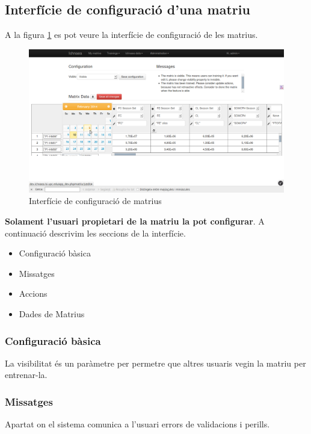 \subsection{Interfície de configuració d'una matriu}
\label{subsec:interfaceConfiguration}
A la figura \ref{fig:configure_matrix} es pot veure la interfície de configuració de les matrius.
\begin{figure}[h!]
  \centering
  \includegraphics[scale=0.2]{img/userguide/matrix_configure.png}
  \caption{Interfície de configuraci\'{o} de matrius}
  \label{fig:configure_matrix}
\end{figure}

\textbf{Solament l'usuari propietari de la matriu la pot configurar}. A continuació descrivim les seccions de la interfície.
\begin{itemize}
\item Configuració bàsica
\item Missatges
\item Accions
\item Dades de Matrius
\end{itemize}

\subsubsection{Configuració bàsica}
La visibilitat \'{e}s un paràmetre per permetre que altres usuaris vegin la matriu per entrenar-la.

\subsubsection{Missatges} 
Apartat on el sistema comunica a l'usuari errors de validacions i perills.

